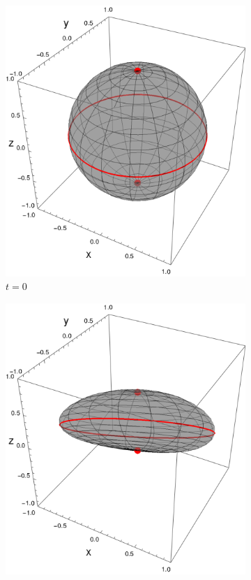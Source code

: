 \begin{figure}[ht!]
  \centering
  \begin{subfigure}{0.32\textwidth}
    \centering
    \includegraphics[width=0.9\linewidth]{chapter3/figures_toy/sphere_CNOT_t=0._r=0.9_p=0.1.png}
    \caption{$t=0$}
  \end{subfigure}%
  \begin{subfigure}{0.32\textwidth}
    \centering
    \includegraphics[width=0.9\linewidth]{chapter3/figures_toy/sphere_CNOT_t=0.5_r=0.9_p=0.1.png}

\end{subfigure}
\end{figure}
